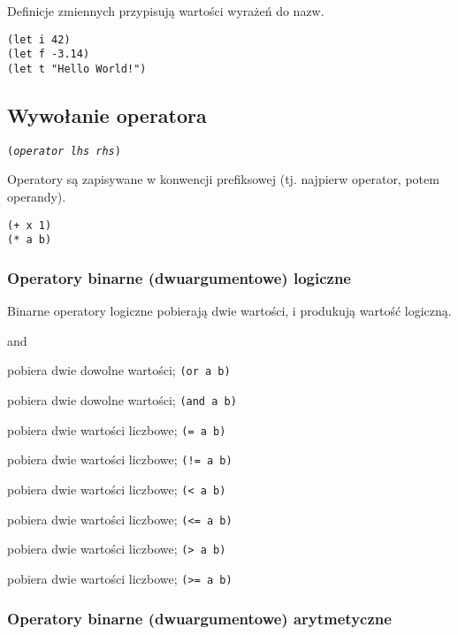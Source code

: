 Definicje zmiennych przypisują wartości wyrażeń do nazw.

\begin{lstlisting}
(let i 42)
(let f -3.14)
(let t "Hello World!")
\end{lstlisting}

\subsection{Wywołanie operatora}

\texttt{(\emph{operator} \emph{lhs} \emph{rhs})}
\vspace{1em}

Operatory są zapisywane w konwencji prefiksowej (tj. najpierw operator, potem operandy).

\begin{lstlisting}
(+ x 1)
(* a b)
\end{lstlisting}

\subsubsection{Operatory binarne (dwuargumentowe) logiczne}

Binarne operatory logiczne pobierają dwie wartości, i produkują wartość logiczną.

\begin{labeling}{and}
    \item[\texttt{or}] pobiera dwie dowolne wartości; \texttt{(or a b)}
    \item[\texttt{and}] pobiera dwie dowolne wartości; \texttt{(and a b)}
    \item[\texttt{=}] pobiera dwie wartości liczbowe; \texttt{(= a b)}
    \item[\texttt{!=}] pobiera dwie wartości liczbowe; \texttt{(!= a b)}
    \item[\texttt{<}] pobiera dwie wartości liczbowe; \texttt{(< a b)}
    \item[\texttt{<=}] pobiera dwie wartości liczbowe; \texttt{(<= a b)}
    \item[\texttt{>}] pobiera dwie wartości liczbowe; \texttt{(> a b)}
    \item[\texttt{>=}] pobiera dwie wartości liczbowe; \texttt{(>= a b)}
\end{labeling}

\subsubsection{Operatory binarne (dwuargumentowe) arytmetyczne}

